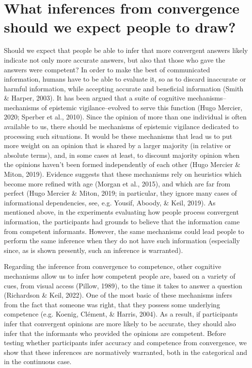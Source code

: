 \documentclass[
  doc,floatsintext]{apa6}
\begin{document}
\section{What inferences from convergence should we expect people to draw?}\label{what-inferences-from-convergence-should-we-expect-people-to-draw}

Should we expect that people be able to infer that more convergent answers likely indicate not only more accurate answers, but also that those who gave the answers were competent? In order to make the best of communicated information, humans have to be able to evaluate it, so as to discard inaccurate or harmful information, while accepting accurate and beneficial information (Smith \& Harper, 2003). It has been argued that a suite of cognitive mechanisms--mechanisms of epistemic vigilance--evolved to serve this function (Hugo Mercier, 2020; Sperber et al., 2010). Since the opinion of more than one individual is often available to us, there should be mechanisms of epistemic vigilance dedicated to processing such situations. It would be these mechanisms that lead us to put more weight on an opinion that is shared by a larger majority (in relative or absolute terms), and, in some cases at least, to discount majority opinion when the opinions haven't been formed independently of each other (Hugo Mercier \& Miton, 2019). Evidence suggests that these mechanisms rely on heuristics which become more refined with age (Morgan et al., 2015), and which are far from perfect (Hugo Mercier \& Miton, 2019; in particular, they ignore many cases of informational dependencies, see, e.g. Yousif, Aboody, \& Keil, 2019). As mentioned above, in the experiments evaluating how people process convergent information, the participants had grounds to believe that the information came from competent informants. However, the same mechanisms could lead people to perform the same inference when they do not have such information (especially since, as is shown presently, such an inference is warranted).

Regarding the inference from convergence to competence, other cognitive mechanisms allow us to infer how competent people are, based on a variety of cues, from visual access (Pillow, 1989), to the time it takes to answer a question (Richardson \& Keil, 2022). One of the most basic of these mechanisms infers from the fact that someone was right, that they possess some underlying competence (e.g. Koenig, Clément, \& Harris, 2004). As a result, if participants infer that convergent opinions are more likely to be accurate, they should also infer that the informants who provided the opinions are competent. Before testing whether participants infer accuracy and competence from convergence, we show that these inferences are normatively warranted, both in the categorical and in the continuous case.
\end{document}
